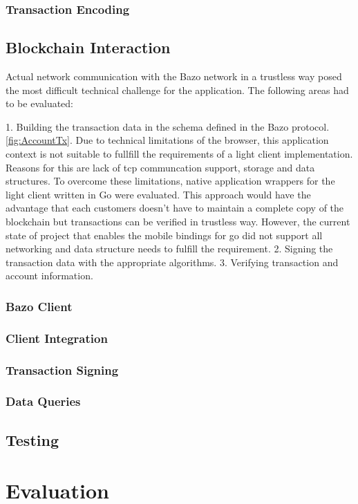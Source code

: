 \documentclass[a4paper]{article}
\begin{document}
\subsubsection{Transaction Encoding}

\subsection{Blockchain Interaction}
Actual network communication with the Bazo network in a trustless way posed the most difficult technical challenge for the application. The following areas had to be evaluated:

1. Building the transaction data in the schema defined in the Bazo protocol. \ref{fig:AccountTx}.
Due to technical limitations of the browser, this application context is not suitable to fullfill the requirements of a light client implementation. Reasons for this are lack of tcp communcation support, storage and data structures.
To overcome these limitations, native application wrappers for the light client written in Go were evaluated. This approach would have the advantage that each customers doesn't have to maintain a complete copy of the blockchain but transactions can be verified in trustless way. However, the current state of project that enables the mobile bindings for go did not support all networking and data structure needs to fulfill the requirement. \cite{godocs}
2. Signing the transaction data with the appropriate algorithms.
3. Verifying transaction and account information.
\subsubsection{Bazo Client}
\subsubsection{Client Integration}
\subsubsection{Transaction Signing}
\subsubsection{Data Queries}

\subsection{Testing}
\newpage

\section{Evaluation}
\end{document}
